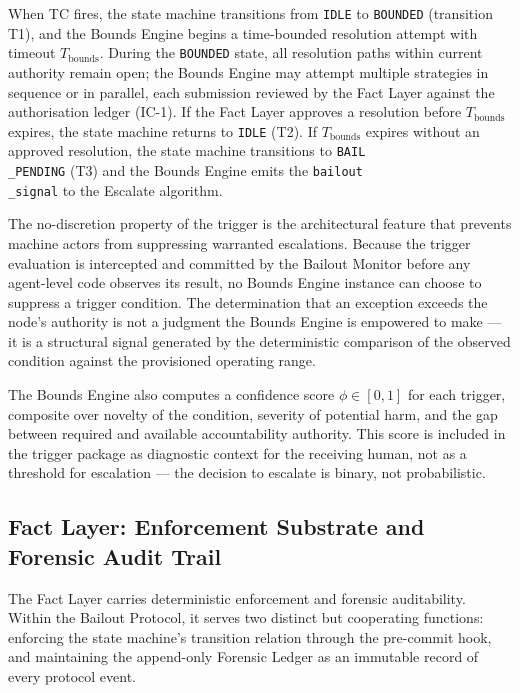 When TC fires, the state machine transitions from \texttt{IDLE} to \texttt{BOUNDED} (transition T1), and the Bounds Engine begins a time-bounded resolution attempt with timeout $T_{\text{bounds}}$. During the \texttt{BOUNDED} state, all resolution paths within current authority remain open; the Bounds Engine may attempt multiple strategies in sequence or in parallel, each submission reviewed by the Fact Layer against the authorisation ledger (IC-1). If the Fact Layer approves a resolution before $T_{\text{bounds}}$ expires, the state machine returns to \texttt{IDLE} (T2). If $T_{\text{bounds}}$ expires without an approved resolution, the state machine transitions to \texttt{BAIL\\_PENDING} (T3) and the Bounds Engine emits the \texttt{bailout\\_signal} to the Escalate algorithm.

The no-discretion property of the trigger is the architectural feature that prevents machine actors from suppressing warranted escalations. Because the trigger evaluation is intercepted and committed by the Bailout Monitor before any agent-level code observes its result, no Bounds Engine instance can choose to suppress a trigger condition. The determination that an exception exceeds the node's authority is not a judgment the Bounds Engine is empowered to make — it is a structural signal generated by the deterministic comparison of the observed condition against the provisioned operating range.

The Bounds Engine also computes a confidence score $\phi \in [0,1]$ for each trigger, composite over novelty of the condition, severity of potential harm, and the gap between required and available accountability authority. This score is included in the trigger package as diagnostic context for the receiving human, not as a threshold for escalation — the decision to escalate is binary, not probabilistic.

\subsection{Fact Layer: Enforcement Substrate and Forensic Audit Trail}
\label{sec:fact-layer}

The Fact Layer carries deterministic enforcement and forensic auditability. Within the Bailout Protocol, it serves two distinct but cooperating functions: enforcing the state machine's transition relation through the pre-commit hook, and maintaining the append-only Forensic Ledger as an immutable record of every protocol event.

